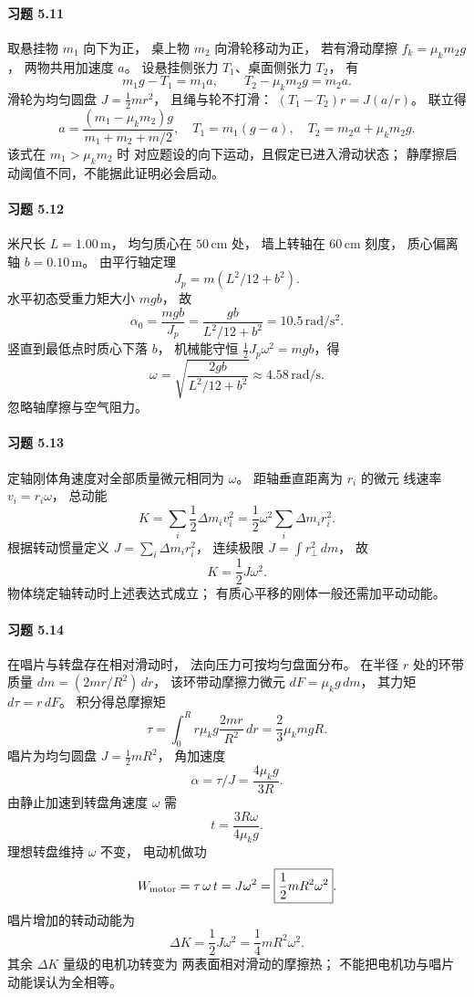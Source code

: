 \paragraph{习题 5.11}
取悬挂物 \(m_1\) 向下为正，
桌上物 \(m_2\) 向滑轮移动为正，
若有滑动摩擦 \(f_k=\mu_km_2g\)，
两物共用加速度 \(a\)。
设悬挂侧张力 \(T_1\)、桌面侧张力 \(T_2\)，
有
\[
 m_1g-T_1=m_1a,\qquad
 T_2-\mu_km_2g=m_2a.
\]
滑轮为均匀圆盘 \(J=\tfrac12mr^2\)，
且绳与轮不打滑：
\((T_1-T_2)r=J(a/r)\)。
联立得
\[
 \boxed{a=\frac{(m_1-\mu_km_2)g}
 {m_1+m_2+m/2}},\quad
 \boxed{T_1=m_1(g-a)},\quad
 \boxed{T_2=m_2a+\mu_km_2g}.
\]
该式在 \(m_1>\mu_km_2\) 时
对应题设的向下运动，且假定已进入滑动状态；
静摩擦启动阈值不同，不能据此证明必会启动。

\paragraph{习题 5.12}
米尺长 \(L=1.00\,\mathrm m\)，
均匀质心在 \(50\,\mathrm{cm}\) 处，
墙上转轴在 \(60\,\mathrm{cm}\) 刻度，
质心偏离轴 \(b=0.10\,\mathrm m\)。
由平行轴定理
\[
 J_p=m(L^2/12+b^2).
\]
水平初态受重力矩大小 \(mgb\)，
故
\[
 \boxed{\alpha_0=\frac{mgb}{J_p}
 =\frac{gb}{L^2/12+b^2}
 =10.5\,\mathrm{rad/s^2}}.
\]
竖直到最低点时质心下落 \(b\)，
机械能守恒
\(\tfrac12J_p\omega^2=mgb\)，得
\[
 \boxed{\omega=\sqrt{\frac{2gb}{L^2/12+b^2}}
 \approx4.58\,\mathrm{rad/s}}.
\]
忽略轴摩擦与空气阻力。

\paragraph{习题 5.13}
定轴刚体角速度对全部质量微元相同为 \(\omega\)。
距轴垂直距离为 \(r_i\) 的微元
线速率 \(v_i=r_i\omega\)，
总动能
\[
 K=\sum_i\frac12\Delta m_i v_i^2
 =\frac12\omega^2\sum_i\Delta m_i r_i^2.
\]
根据转动惯量定义
\(J=\sum_i\Delta m_i r_i^2\)，
连续极限 \(J=\int r_\perp^2\,dm\)，
故
\[
 \boxed{K=\frac12J\omega^2}.
\]
物体绕定轴转动时上述表达式成立；
有质心平移的刚体一般还需加平动动能。

\paragraph{习题 5.14}
在唱片与转盘存在相对滑动时，
法向压力可按均匀盘面分布。
在半径 \(r\) 处的环带质量
\(dm=(2mr/R^2)\,dr\)，
该环带动摩擦力微元
\(dF=\mu_kg\,dm\)，
其力矩 \(d\tau=r\,dF\)。
积分得总摩擦矩
\[
 \tau=\int_0^Rr\mu_kg\frac{2mr}{R^2}\,dr
 =\frac23\mu_kmgR.
\]
唱片为均匀圆盘 \(J=\tfrac12mR^2\)，
角加速度
\[
 \alpha=\tau/J=\frac{4\mu_kg}{3R}.
\]
由静止加速到转盘角速度 \(\omega\) 需
\[
 \boxed{t=\frac{3R\omega}{4\mu_kg}}.
\]
理想转盘维持 \(\omega\) 不变，
电动机做功
\[
 W_{\rm motor}=\tau\,\omega\,t
 =J\omega^2=\boxed{\frac12mR^2\omega^2}.
\]
唱片增加的转动动能为
\[
 \boxed{\Delta K=\frac12J\omega^2
 =\frac14mR^2\omega^2}.
\]
其余 \(\Delta K\) 量级的电机功转变为
两表面相对滑动的摩擦热；
不能把电机功与唱片动能误认为全相等。

